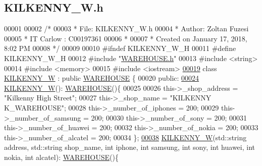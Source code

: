 \hypertarget{_k_i_l_k_e_n_n_y___w_8h_source}{}\subsection{K\+I\+L\+K\+E\+N\+N\+Y\+\_\+\+W.\+h}

\begin{DoxyCode}
00001 
00002 \textcolor{comment}{/* }
00003 \textcolor{comment}{ * File:   KILKENNY\_W.h}
00004 \textcolor{comment}{ * Author: Zoltan Fuzesi}
00005 \textcolor{comment}{ * IT Carlow : C00197361}
00006 \textcolor{comment}{ *}
00007 \textcolor{comment}{ * Created on January 17, 2018, 8:02 PM}
00008 \textcolor{comment}{ */}
00009 
00010 \textcolor{preprocessor}{#ifndef KILKENNY\_W\_H}
00011 \textcolor{preprocessor}{#define KILKENNY\_W\_H}
00012 \textcolor{preprocessor}{#include "\hyperlink{_w_a_r_e_h_o_u_s_e_8h}{WAREHOUSE.h}"}
00013 \textcolor{preprocessor}{#include <string>}
00014 \textcolor{preprocessor}{#include <memory>}
00015 \textcolor{preprocessor}{#include <iostream>}
\hypertarget{_k_i_l_k_e_n_n_y___w_8h_source.tex_l00019}{}\hyperlink{class_k_i_l_k_e_n_n_y___w}{00019} \textcolor{keyword}{class }\hyperlink{class_k_i_l_k_e_n_n_y___w}{KILKENNY\_W} : \textcolor{keyword}{public} \hyperlink{class_w_a_r_e_h_o_u_s_e}{WAREHOUSE} \{
00020 \textcolor{keyword}{public}:
\hypertarget{_k_i_l_k_e_n_n_y___w_8h_source.tex_l00024}{}\hyperlink{class_k_i_l_k_e_n_n_y___w_aee4c4b30bc934ff827f0851077b7fbab}{00024}     \hyperlink{class_k_i_l_k_e_n_n_y___w_aee4c4b30bc934ff827f0851077b7fbab}{KILKENNY\_W}(): \hyperlink{class_w_a_r_e_h_o_u_s_e}{WAREHOUSE}()\{
00025         
00026         this->\_shop\_address = \textcolor{stringliteral}{"Kilkenny High Street"};
00027         this->\_shop\_name = \textcolor{stringliteral}{"KILKENNY K\_WAREHOUSE"};
00028         this->\_number\_of\_iphones = 200;
00029         this->\_number\_of\_samsung = 200;
00030         this->\_number\_of\_sony = 200;
00031         this->\_number\_of\_huawei = 200;
00032         this->\_number\_of\_nokia = 200;
00033         this->\_number\_of\_alcatel = 200;
00034     \};
\hypertarget{_k_i_l_k_e_n_n_y___w_8h_source.tex_l00038}{}\hyperlink{class_k_i_l_k_e_n_n_y___w_a292872c50225002759ebe70be3c96a72}{00038}     \hyperlink{class_k_i_l_k_e_n_n_y___w_a292872c50225002759ebe70be3c96a72}{KILKENNY\_W}(std::string address, std::string shop\_name, \textcolor{keywordtype}{int} iphone, \textcolor{keywordtype}{int} samsung, \textcolor{keywordtype}{int} sony, \textcolor{keywordtype}{int}
       huawei, \textcolor{keywordtype}{int} nokia, \textcolor{keywordtype}{int} alcatel): \hyperlink{class_w_a_r_e_h_o_u_s_e}{WAREHOUSE}()\{

\end{DoxyCode}
